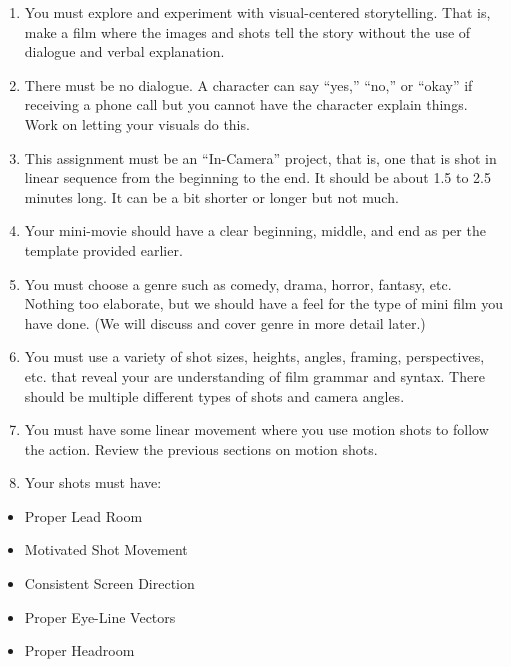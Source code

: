 \documentclass[
]{book}
\providecommand{\tightlist}{%
  \setlength{\itemsep}{0pt}\setlength{\parskip}{0pt}}
\begin{document}
\begin{assessment}
\begin{enumerate}
\def\labelenumi{\arabic{enumi}.}
\tightlist
\item
  You must explore and experiment with visual-centered storytelling. That is, make a film where the images and shots tell the story without the use of dialogue and verbal explanation.\\
\item
  There must be no dialogue. A character can say ``yes,'' ``no,'' or ``okay'' if receiving a phone call but you cannot have the character explain things. Work on letting your visuals do this.\\
\item
  This assignment must be an ``In-Camera'' project, that is, one that is shot in linear sequence from the beginning to the end. It should be about 1.5 to 2.5 minutes long. It can be a bit shorter or longer but not much.\\
\item
  Your mini-movie should have a clear beginning, middle, and end as per the template provided earlier.\\
\item
  You must choose a genre such as comedy, drama, horror, fantasy, etc. Nothing too elaborate, but we should have a feel for the type of mini film you have done. (We will discuss and cover genre in more detail later.)\\
\item
  You must use a variety of shot sizes, heights, angles, framing, perspectives, etc. that reveal your are understanding of film grammar and syntax. There should be multiple different types of shots and camera angles.\\
\item
  You must have some linear movement where you use motion shots to follow the action. Review the previous sections on motion shots.\\
\item
  Your shots must have:
\end{enumerate}

\begin{itemize}
\tightlist
\item
  Proper Lead Room\\
\item
  Motivated Shot Movement\\
\item
  Consistent Screen Direction\\
\item
  Proper Eye-Line Vectors\\
\item
  Proper Headroom
\end{itemize}


\end{assessment}
\end{document}
